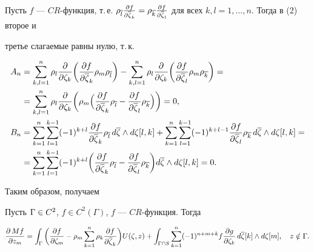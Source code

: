 Пусть $f$ --- $CR$-функция, т.\,е. $\ovlr{l}\Pd{f}{\ovl\zt_k}=\ovlr{k}


\Pd{f}{\ovl\zt_l}$ для всех $k,l=1,\dotsc,n$. Тогда в (2) второе и


третье слагаемые равны нулю, т.\,к.


\begin{align*}


A_n&=\sum_{k,l=1}^n\r{l}\pdd{\zt_k}\bigg(\Pd{f}{\ovl\zt_k}\r{m}\ovlr{l}\bigg)


-\sum_{k,l=1}^n\r{l}\pdd{\zt_k}\bigg(\Pd{f}{\ovl\zt_l}\r{m}\ovlr{k}\bigg)=\\


&=\sum_{k,l=1}^n\r{l}\pdd{\zt_k}\bigg(\r{m}\Big(\Pd{f}{\ovl\zt_k}\ovlr{l}


-\Pd{f}{\ovl\zt_l}\ovlr{k}\Big)\bigg)=0,\\


%


B_n&=\sm\sum_{l=1}^{k-1}(-1)^{k+l}


\Pd{f}{\ovl\zt_k}\ovlr{l}\,d\ovl\zt\ld d\zt[l,k]


+\sm\sum_{l=1}^{k-1}(-1)^{k+l-1}


\Pd{f}{\ovl\zt_l}\ovlr{k}\,d\ovl\zt\ld d\zt[l,k]=\\


%


&=\sm\sum_{l=1}^{k-1}(-1)^{k+l}\bigg(\Pd{f}{\ovl\zt_k}\ovlr{l}


-\Pd{f}{\ovl\zt_l}\ovlr{k}\bigg)d\ovl\zt\ld d\zt[l,k]=0.


\end{align*}


Таким образом, получаем





\begin{cor}


Пусть $\Gamma\in C^2$, $f\in C^2(\Gamma)$, $f$ --- $CR$-функция. Тогда


$$


\Pd{\,Mf}{z_m}=\ig\bigg(\Pd{f}{\zt_m}


-\r{m}\sm\r{k}\Pd{f}{\ovl\zt_k}\bigg)U(\zeta,z)+


\igs\sm(-1)^{n+m+k} f\Pd{g}{\zt_k}\,d\ovl\zt[k]\ld d\zt[m],


\quad z\notin\Gamma.


$$


\end{cor}






